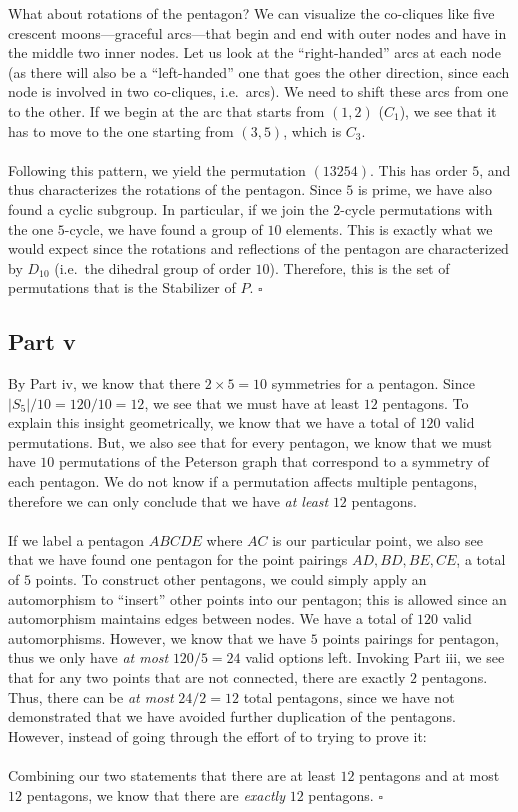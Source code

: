 \documentclass[letterpaper]{article}
\newcommand*{\QED}{\hfill\ensuremath{\square}}%
\begin{document}
What about rotations of the pentagon?
We can visualize the co-cliques like five crescent moons---graceful arcs---that begin and end with outer nodes and have in the middle two inner nodes.
Let us look at the ``right-handed'' arcs at each node (as there will also be a ``left-handed'' one that goes the other direction, since each node is involved in two co-cliques, i.e.\ arcs).
We need to shift these arcs from one to the other.
If we begin at the arc that starts from $ (1,2) $ ($ C_1 $), we see that it has to move to the one starting from $ (3,5) $, which is $ C_3 $.
\\ \\
Following this pattern, we yield the permutation $ (13254) $.
This has order $ 5 $, and thus characterizes the rotations of the pentagon.
Since $ 5 $ is prime, we have also found a cyclic subgroup.
In particular, if we join the $ 2 $-cycle permutations with the one $ 5 $-cycle, we have found a group of $ 10 $ elements.
This is exactly what we would expect since the rotations and reflections of the pentagon are characterized by $ D_{10} $ (i.e.\ the dihedral group of order $ 10 $).
Therefore, this is the set of permutations that is the Stabilizer of $ P $.
\QED{}

\subsection{Part v}
\label{subs:2Partv}

By Part iv, we know that there $ 2 \times 5 = 10 $ symmetries for a pentagon.
Since $ |S_5| / 10 = 120 / 10 = 12 $, we see that we must have at least $ 12 $ pentagons.
To explain this insight geometrically, we know that we have a total of $ 120 $ valid permutations.
But, we also see that for every pentagon, we know that we must have $ 10 $ permutations of the Peterson graph that correspond to a symmetry of each pentagon.
We do not know if a permutation affects multiple pentagons, therefore we can only conclude that we have \textit{at least} $ 12 $ pentagons.
\\ \\
If we label a pentagon $ ABCDE $ where $ AC $ is our particular point, we also see that we have found one pentagon for the point pairings $ AD, BD, BE, CE $, a total of $ 5 $ points.
To construct other pentagons, we could simply apply an automorphism to ``insert'' other points into our pentagon; this is allowed since an automorphism maintains edges between nodes.
We have a total of $ 120 $ valid automorphisms.
However, we know that we have $ 5 $ points pairings for pentagon, thus we only have \textit{at most} $ 120 / 5 = 24 $ valid options left.
Invoking Part iii, we see that for any two points that are not connected, there are exactly $ 2 $ pentagons.
Thus, there can be \textit{at most} $ 24 / 2 = 12 $ total pentagons, since we have not demonstrated that we have avoided further duplication of the pentagons.
However, instead of going through the effort of to trying to prove it:
\\ \\
Combining our two statements that there are at least $ 12 $ pentagons and at most $ 12 $ pentagons, we know that there are \textit{exactly} $ 12 $ pentagons.
\QED{}
\end{document}
